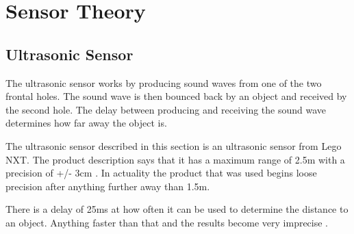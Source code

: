 \chapter{Sensor Theory}\label{SensorTheory}
\section{Ultrasonic Sensor}
The ultrasonic sensor works by producing sound waves from one of the two
frontal holes. The sound wave is then bounced back by an object and received by
the second hole. The delay between producing and receiving the sound wave
determines how far away the object is.

The ultrasonic sensor described in this section is an ultrasonic sensor from
Lego NXT. The product description says that it has a maximum range of 2.5m with
a precision of +/- 3cm \citep{Ultrasonic_sensor}\KT. In actuality the product
that was used begins loose precision after anything further away than 1.5m.

There is a delay of 25ms at how often it can be used to determine the distance
to an object. Anything faster than that and the results become very imprecise
\Source.













